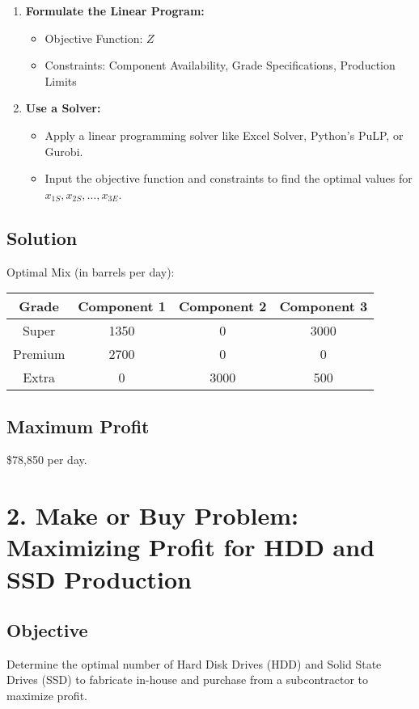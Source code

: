 \documentclass[12pt]{article}
\begin{document}
\begin{enumerate}
    \item \textbf{Formulate the Linear Program:}
    \begin{itemize}
        \item Objective Function: \( Z \)
        \item Constraints: Component Availability, Grade Specifications, Production Limits
    \end{itemize}
    
    \item \textbf{Use a Solver:}
    \begin{itemize}
        \item Apply a linear programming solver like Excel Solver, Python's PuLP, or Gurobi.
        \item Input the objective function and constraints to find the optimal values for \( x_{1S}, x_{2S}, \ldots, x_{3E} \).
    \end{itemize}
\end{enumerate}

\subsection*{Solution}
Optimal Mix (in barrels per day):

\begin{tabular}{|c|c|c|c|}
\hline
Grade & Component 1 & Component 2 & Component 3 \\
\hline
Super & 1350 & 0 & 3000 \\
Premium & 2700 & 0 & 0 \\
Extra & 0 & 3000 & 500 \\
\hline
\end{tabular}

\subsection*{Maximum Profit}
\$78,850 per day.

\vspace{290pt}
\newpage
\section*{2. Make or Buy Problem: Maximizing Profit for HDD and SSD Production}

\subsection*{Objective}
Determine the optimal number of Hard Disk Drives (HDD) and Solid State Drives (SSD) to fabricate in-house and purchase from a subcontractor to maximize profit.
\end{document}
